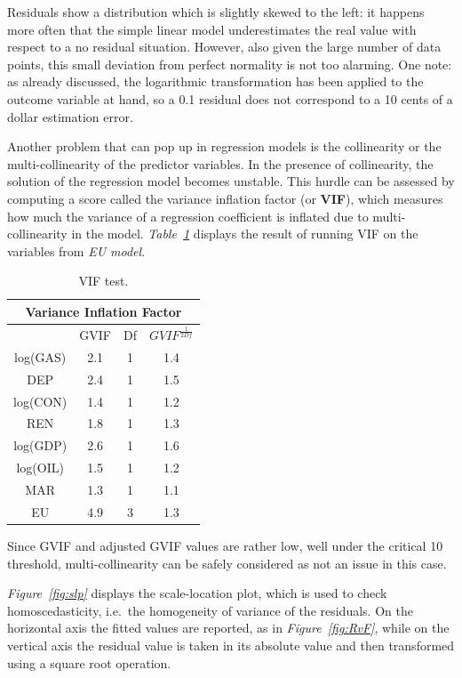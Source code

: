 \documentclass[a4paper,12pt]{book}
\begin{document}
Residuals show a distribution which is slightly skewed to the left: it happens more often that the simple linear model underestimates the real value with respect to a no residual situation. However, also given the large number of data points, this small deviation from perfect normality is not too alarming. One note: as already discussed, the logarithmic transformation has been applied to the outcome variable at hand, so a 0.1 residual does not correspond to a 10 cents of a dollar estimation error.

Another problem that can pop up in regression models is the collinearity or the multi-collinearity of the predictor variables. In the presence of collinearity, the solution of the regression model becomes unstable. This hurdle can be assessed by computing a score called the variance inflation factor (or \textbf{VIF}), which measures how much the variance of a regression coefficient is inflated due to multi-collinearity in the model. \textit{Table~\ref{Tab:vif}} displays the result of running VIF on the variables from \textit{EU model}.

\begin{table}[tb]
\begin{center}
\begin{tabular}{|c|c|c|c|}
\hline
\multicolumn{4}{|c|}{Variance Inflation Factor}\\
\hline
&GVIF&Df&$GVIF^{\frac{1}{2Df}}$\\
\hline
log(GAS)&2.1&1&1.4\\
DEP&2.4&1&1.5\\
log(CON)&1.4&1&1.2\\
REN&1.8&1&1.3\\
log(GDP)&2.6&1&1.6\\
log(OIL)&1.5&1&1.2\\
MAR&1.3&1&1.1\\
EU&4.9&3&1.3\\
\hline
\end{tabular}
\caption{VIF test.}
\label{Tab:vif}
\end{center}
\end{table}

Since GVIF and adjusted GVIF values are rather low, well under the critical 10 threshold, multi-collinearity can be safely considered as not an issue in this case.

\textit{Figure~\ref{fig:slp}} displays the scale-location plot, which is used to check homoscedasticity, i.e.\ the homogeneity of variance of the residuals. On the horizontal axis the fitted values are reported, as in \textit{Figure~\ref{fig:RvF}}, while on the vertical axis the residual value is taken in its absolute value and then transformed using a square root operation.
\end{document}
